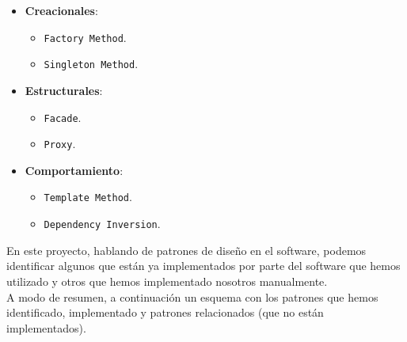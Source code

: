 \documentclass[../ei103948-project-documentation.tex]{subfiles}
\begin{document}
                    \begin{itemize}
                        \item \textbf{Creacionales}:
                            \begin{itemize}
                                \item [\faIcon{pencil-alt}] \texttt{Factory Method}.
                                \item [\faIcon{eye}] \texttt{Singleton Method}.
                            \end{itemize}
                        \item \textbf{Estructurales}:
                            \begin{itemize}
                                \item [\faIcon{pencil-alt}] \texttt{Facade}.
                                \item [\faIcon{eye}] \texttt{Proxy}.
                            \end{itemize}
                        \item \textbf{Comportamiento}:
                            \begin{itemize}
                                \item [\faIcon{pencil-alt}] \texttt{Template Method}.
                                \item [\faIcon{eye}] \texttt{Dependency Inversion}.
                            \end{itemize}
                    \end{itemize}
            
            
                En este proyecto, hablando de patrones de diseño en el software, podemos identificar algunos que están ya implementados por parte del software que hemos utilizado y otros que hemos implementado nosotros manualmente.\\
                
                A modo de resumen, a continuación un esquema con los patrones que hemos identificado, implementado y patrones relacionados (que no están implementados).
            
\end{document}

